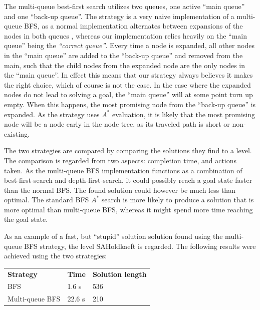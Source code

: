 \documentclass[Main]{subfiles}
\begin{document}
The multi-queue best-first search utilizes two queues, one active ``main queue''
and one ``back-up queue''. The strategy is a very naive implementation of a
multi-queue BFS, as a normal implementation alternates between expansions of the
nodes in both queues \citep{hector2013a}, whereas our implementation relies
heavily on the ``main queue'' being the \textit{``correct queue''}. Every time a
node is expanded, all other nodes in the ``main queue'' are added to the
``back-up queue'' and removed from the main, such that the child nodes from the
expanded node are the only nodes in the ``main queue''. In effect this means
that our strategy always believes it makes the right choice, which of course is
not the case. In the case where the expanded nodes do not lead to solving a
goal, the ``main queue'' will at some point turn up empty. When this happens,
the most promising node from the ``back-up queue'' is expanded. As the strategy
uses $A^*$ evaluation, it is likely that the most promising node will be a node
early in the node tree, as its traveled path is short or non-existing. 

The two strategies are compared by comparing the solutions they find to a level.
The comparison is regarded from two aspects: completion time, and actions taken.
As the multi-queue BFS implementation functions as a combination of
best-first-search and depth-first-search, it could possibly reach a goal state
faster than the normal BFS. The found solution could however be much less than
optimal. The standard BFS $A^*$ search is more likely to produce a solution that
is more optimal than multi-queue BFS, whereas it might spend more time reaching
the goal state. 

As an example of a fast, but ``stupid'' solution solution found using the
multi-queue BFS strategy, the level SAHoldkaeft is regarded. The following
results were achieved using the two strategies:

\begin{table}[h]
\begin{tabular}{lll}
\rowcolor{grayish}
\textbf{Strategy} & \textbf{Time} & \textbf{Solution length} \\   %
BFS             & 1.6 s        & 536                       \\    %
Multi-queue BFS & 22.6 s       & 210                       %
\end{tabular}
\end{table}
\end{document}
